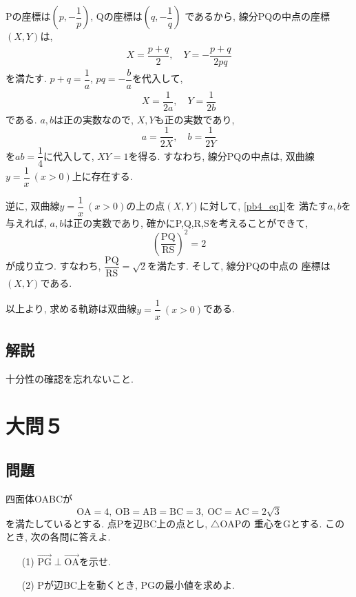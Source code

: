 \documentclass[dvipdfmx,a4paper]{jsarticle}
\newcommand{\oraw}{\overrightarrow}
\newcommand{\2}{I\hspace{-1pt}I}
\newcommand{\3}{I\hspace{-1pt}I\hspace{-1pt}I}
\begin{document}
    Pの座標は$\left(p, -\dfrac{1}{p}\right)$, Qの座標は$\left(q, -\dfrac{1}{q} \right)$
    であるから, 線分PQの中点の座標$(X,Y)$は, 
    \begin{align*}
        X = \dfrac{p+q}{2}, \quad Y = -\dfrac{p+q}{2pq}
    \end{align*}
    を満たす. $p + q = \dfrac{1}{a}$, $pq = -\dfrac{b}{a}$を代入して, 
    \begin{align*}
        X = \dfrac{1}{2a}, \quad Y = \dfrac{1}{2b}
    \end{align*}
    である. $a,b$は正の実数なので, $X,Y$も正の実数であり, 
    \begin{equation} \label{pb4_eq1}
        a = \dfrac{1}{2X}, \quad b = \dfrac{1}{2Y}
    \end{equation}
    を$ab=\dfrac{1}{4}$に代入して, $XY=1$を得る. すなわち, 線分PQの中点は, 
    双曲線$y=\dfrac{1}{x} \ (x>0)$上に存在する. 

    逆に, 双曲線$y=\dfrac{1}{x} \ (x>0)$の上の点$(X,Y)$に対して, \eqref{pb4_eq1}を
    満たす$a,b$を与えれば, $a,b$は正の実数であり, 確かにP,Q,R,Sを考えることができて, 
    \begin{equation*}
        \left(\dfrac{\mathrm{PQ}}{\mathrm{RS}} \right)^2 = 2
    \end{equation*}
    が成り立つ. すなわち, $\mathrm{\dfrac{PQ}{RS} = \sqrt{2}}$を満たす. そして, 線分PQの中点の
    座標は$(X,Y)$である. 

    以上より, 求める軌跡は双曲線$y=\dfrac{1}{x} \ (x>0)$である. 

    \subsection{解説}
    十分性の確認を忘れないこと. 

    \section{大問５}
    \subsection{問題}
    四面体OABCが
    \begin{equation*}
        \mathrm{
            OA = 4,\ OB=AB=BC=3,\ OC=AC=2\sqrt{3}
        }
    \end{equation*}
    を満たしているとする. 点Pを辺BC上の点とし, $\triangle \mathrm{OAP}$の
    重心をGとする. このとき, 次の各問に答えよ. 
    \begin{itemize}
        \item [(1)] $\oraw{\mathrm{PG}} \perp \oraw{\mathrm{OA}}$を示せ. 
        \item [(2)] Pが辺BC上を動くとき, PGの最小値を求めよ. 
    \end{itemize}
\end{document}
